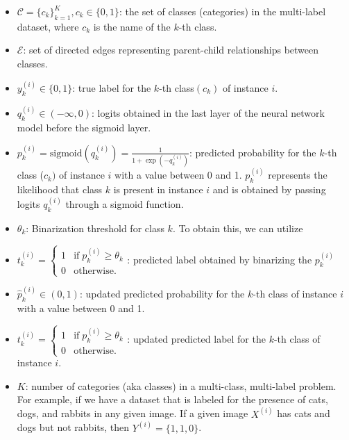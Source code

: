 \begin{itemize}

    \item  $\mathcal{C} = {\{c_k\}}_{k=1}^{K} , c_k \in \{0,1\} $: the set of classes (categories) in the multi-label dataset, where $c_k $ is the name of the $k $-th class.

    \item  $\mathcal{E} $: set of directed edges representing parent-child relationships between classes.

    \item  $y_k^{(i)} \in \{0,1\} $: true label for the $k $-th class$(c_k) $ of instance $i $.

    \item  $q_k^{(i)} \in \left( -\infty,0 \right) $: logits obtained in the last layer of the neural network model before the sigmoid layer.

    \item  $p_k^{(i)} = \text{sigmoid}\left(q_k^{(i)}\right) = \frac{1}{1+\exp{\left(-q_k^{(i)}\right)}} $: predicted probability for the $k $-th class ($c_k) $ of instance $i $ with a value between 0 and 1. $p_k^{(i)} $ represents the likelihood that class $k $ is present in instance $i $ and is obtained by passing logits $q_k^{(i)} $ through a sigmoid function.

    \item  $\theta_k $: Binarization threshold for class $k $. To obtain this, we can utilize

    \item  $t_k^{(i)}=\left\{\begin{array}{lc}1&\text{if}\;p_k^{(i)} \geq \theta_k\\0&\text{otherwise.}\end{array}\right. $: predicted label obtained by binarizing the $p_k^{(i)} $

    \item  ${\widehat p}_k^{(i)} \in (0,1) $: updated predicted probability for the $k $-th class of instance $i $ with a value between 0 and 1.

    \item  $t_k^{(i)}=\left\{\begin{array}{lc}1&\text{if}\;p_k^{(i)}\geq\theta_k\\0&\text{otherwise.}\end{array}\right. $: updated predicted label for the $k $-th class of instance $i $.

    \item  $\ensuremath{K} $: number of categories (aka classes) in a multi-class, multi-label problem. For example, if we have a dataset that is labeled for the presence of cats, dogs, and rabbits in any given image. If a given image $X^{(i)} $ has cats and dogs but not rabbits, then $Y^{(i)} = \{1,1,0\} $.


\end{itemize}
